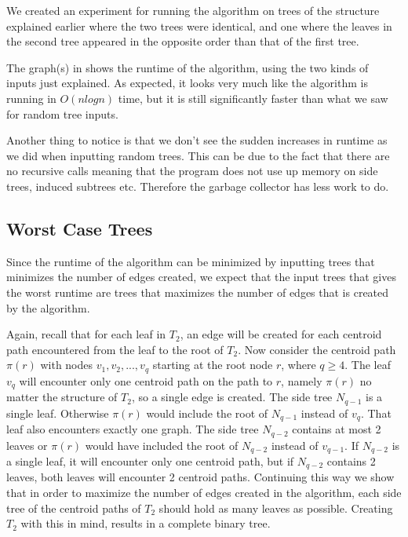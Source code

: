 We created an experiment for running the algorithm on trees of the structure explained earlier where the two trees were identical, and one where the leaves in the second tree appeared in the opposite order than that of the first tree.

The graph(s) in  shows the runtime of the algorithm, using the two kinds of inputs just explained. As expected, it looks very much like the algorithm is running in $O(nlogn)$ time, but it is still significantly faster than what we saw for random tree inputs. 

Another thing to notice is that we don't see the sudden increases in runtime as we did when inputting random trees. This can be due to the fact that there are no recursive calls meaning that the program does not use up memory on side trees, induced subtrees etc. Therefore the garbage collector has less work to do.


\subsection{Worst Case Trees}
Since the runtime of the algorithm can be minimized by inputting trees that minimizes the number of edges created, we expect that the input trees that gives the worst runtime are trees that maximizes the number of edges that is created by the algorithm.

Again, recall that for each leaf in $T_2$, an edge will be created for each centroid path encountered from the leaf to the root of $T_2$. Now consider the centroid path $\pi(r)$ with nodes $v_1, v_2, ..., v_q$ starting at the root node $r$, where $q \ge 4$. The leaf $v_q$ will encounter only one centroid path on the path to $r$, namely $\pi(r)$ no matter the structure of $T_2$, so a single edge is created. The side tree $N_{q-1}$ is a single leaf. Otherwise $\pi(r)$ would include the root of $N_{q-1}$ instead of $v_q$. That leaf also encounters exactly one graph. The side tree $N_{q-2}$ contains at most 2 leaves or $\pi(r)$ would have included the root of $N_{q-2}$ instead of $v_{q-1}$. If $N_{q-2}$ is a single leaf, it will encounter only one centroid path, but if $N_{q-2}$ contains 2 leaves, both leaves will encounter 2 centroid paths. Continuing this way we show that in order to maximize the number of edges created in the algorithm, each side tree of the centroid paths of $T_2$ should hold as many leaves as possible. Creating $T_2$ with this in mind, results in a complete binary tree.

